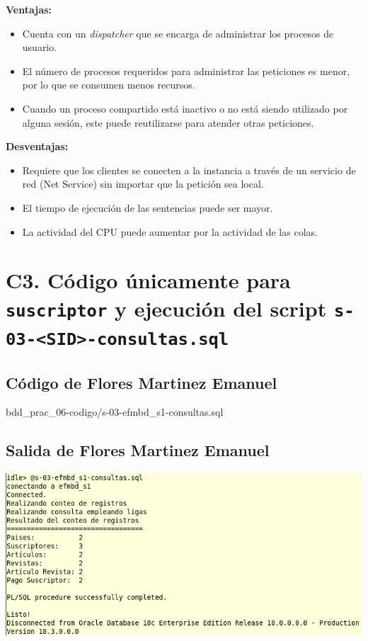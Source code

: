 \documentclass{article}
\newcommand{\codedir}{bdd_prac_06-codigo}
\begin{document}
\textbf{Ventajas:}
\begin{itemize}
    \item Cuenta con un \textit{dispatcher} que se encarga de administrar 
      los procesos de usuario.
    \item El número de procesos requeridos para administrar las peticiones es menor, 
      por lo que se consumen menos recursos.
    \item Cuando un proceso compartido está inactivo o no está siendo utilizado 
    por alguna sesión, este puede reutilizarse para atender otras peticiones. \\
\end{itemize} 

\textbf{Desventajas:}
\begin{itemize}
    \item Requiere que los clientes se conecten a la instancia a través de un 
      servicio de red (Net Service) sin importar que la petición sea local.
    \item El tiempo de ejecución de las sentencias puede ser mayor.
    \item La actividad del CPU puede aumentar por la actividad de las colas.
\end{itemize}

\section*{C3. Código únicamente para \texttt{suscriptor} y ejecución del 
  script \texttt{s-03-<SID>-consultas.sql}}

\subsection*{Código de Flores Martinez Emanuel}


  {\codedir/s-03-efmbd_s1-consultas.sql}

\subsection*{Salida de Flores Martinez Emanuel}

  \includegraphics[width=0.8\linewidth]{efm_c3}
\end{document}
